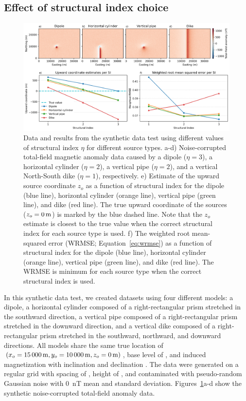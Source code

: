 \subsection{Effect of structural index choice}
\label{sec:si}

\begin{figure}[tb!]
\centering
\includegraphics[width=1\linewidth]{figures/synthetic-structural-index.png}
\caption{
    Data and results from the synthetic data test using different values of structural index $\eta$ for different source types.
    a-d) Noise-corrupted total-field magnetic anomaly data caused by a dipole ($\eta=3$), a horizontal cylinder ($\eta=2$), a vertical pipe ($\eta=2$), and a vertical North-South dike ($\eta=1$), respectively.
    e) Estimate of the upward source coordinate $z_o$ as a function of structural index for the dipole (blue line), horizontal cylinder (orange line), vertical pipe (green line), and dike (red line). 
    The true upward coordinate of the sources ($z_o = \SynSITrueUp$) is marked by the blue dashed line. Note that the $z_o$ estimate is closest to the true value when the correct structural index for each source type is used.
    f) The weighted root mean-squared error (WRMSE; Equation~\ref{eq:wrmse}) as a function of structural index for the dipole (blue line), horizontal cylinder (orange line), vertical pipe (green line), and dike (red line). The WRMSE is minimum for each source type when the correct structural index is used.
}
\label{fig:si}
\end{figure}

In this synthetic data test, we created datasets using four different models: a dipole, a horizontal cylinder composed of a right-rectangular prism stretched in the southward direction, a vertical pipe composed of a right-rectangular prism stretched in the downward direction, and a vertical dike composed of a right-rectangular prism stretched in the southward, northward, and downward directions.
All models share the same true location of $(x_o=\SynSITrueEast, y_o=\SynSITrueNorth, z_o=\SynSITrueUp)$, base level of \SynSITrueBase, and induced magnetization with inclination \SynSIInc{} and declination \SynSIDec.
The data were generated on a regular grid with spacing of \SynSISpacing, height of \SynSIHeight, and contaminated with pseudo-random Gaussian noise with \qty{0}{\nano\tesla} mean and \SynSINoise{} standard deviation. Figures~\ref{fig:si}a-d show the synthetic noise-corrupted total-field anomaly data.

